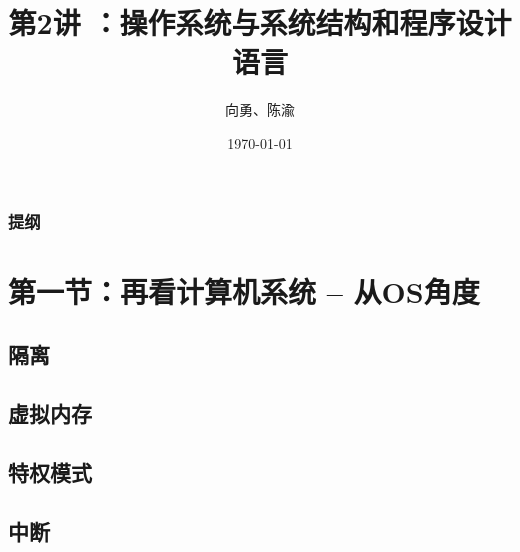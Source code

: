 \documentclass[UTF8]{ctexbeamer}
\title[第2讲]{第2讲 ：操作系统与系统结构和程序设计语言} %
\author{向勇、陈渝} %
\institute[清华大学] %
{
清华大学计算机系 \\ %
\medskip
\textit{xyong,yuchen@tsinghua.edu.cn} %
}
\date{\today} %
\begin{document}
\begin{frame}
\titlepage %
\end{frame}

\begin{frame}
\frametitle{提纲} %
\tableofcontents %
\end{frame}


\section{第一节：再看计算机系统 -- 从OS角度 } %

\subsection{隔离} %
\subsection{虚拟内存}
\subsection{特权模式}
\subsection{中断}
\end{document}

